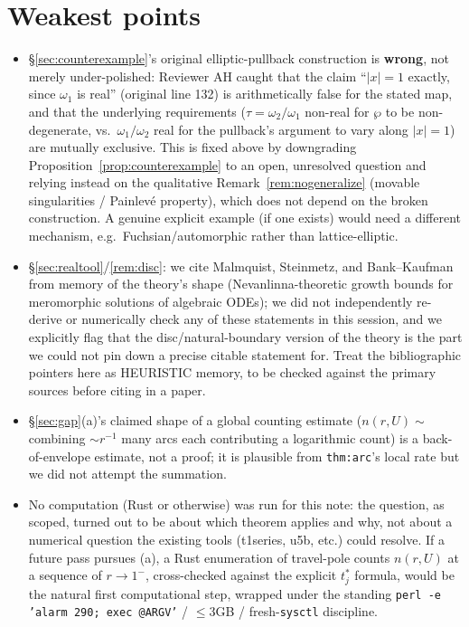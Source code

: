 \documentclass[11pt]{article}
\theoremstyle{remark}
\begin{document}
\section*{Weakest points}
\begin{itemize}
\item \S\ref{sec:counterexample}'s original elliptic-pullback construction is \textbf{wrong}, not
merely under-polished: Reviewer AH caught that the claim ``$|x|=1$ exactly, since $\omega_1$ is real''
(original line 132) is arithmetically false for the stated map, and that the underlying requirements
($\tau=\omega_2/\omega_1$ non-real for $\wp$ to be non-degenerate, vs.\ $\omega_1/\omega_2$ real for the
pullback's argument to vary along $|x|=1$) are mutually exclusive. This is fixed above by downgrading
Proposition~\ref{prop:counterexample} to an open, unresolved question and relying instead on the
qualitative Remark~\ref{rem:nogeneralize} (movable singularities / Painlev\'e property), which does not
depend on the broken construction. A genuine explicit example (if one exists) would need a different
mechanism, e.g.\ Fuchsian/automorphic rather than lattice-elliptic.
\item \S\ref{sec:realtool}/\ref{rem:disc}: we cite Malmquist, Steinmetz, and Bank--Kaufman from
memory of the theory's shape (Nevanlinna-theoretic growth bounds for meromorphic solutions of
algebraic ODEs); we did not independently re-derive or numerically check any of these statements in
this session, and we explicitly flag that the disc/natural-boundary version of the theory is the
part we could not pin down a precise citable statement for. Treat the bibliographic pointers here as
HEURISTIC memory, to be checked against the primary sources before citing in a paper.
\item \S\ref{sec:gap}(a)'s claimed shape of a global counting estimate ($n(r,U)\sim$ combining
$\sim r^{-1}$ many arcs each contributing a logarithmic count) is a back-of-envelope estimate, not a
proof; it is plausible from \texttt{thm:arc}'s local rate but we did not attempt the summation.
\item No computation (Rust or otherwise) was run for this note: the question, as scoped, turned out
to be about which theorem applies and why, not about a numerical question the existing tools (t1series,
u5b, etc.) could resolve. If a future pass pursues (a), a Rust enumeration of travel-pole counts
$n(r,U)$ at a sequence of $r\to1^-$, cross-checked against the explicit $t^\ast_j$ formula, would be
the natural first computational step, wrapped under the standing \texttt{perl -e 'alarm 290; exec
@ARGV'} / $\le3$GB / fresh-\texttt{sysctl} discipline.
\end{itemize}
\end{document}
